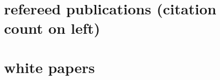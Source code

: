 \documentclass[]{luger-cv} %
\begin{document}
\header





\section{refereed publications {\small \normalfont (citation count on left)} }
%
\begin{list}{}{\pubslist}
    
\end{list}
%
\vspace{1em}

\section{white papers}
%                                                                                                                                                  
\begin{list}{}{\pubslist}
    
\end{list}
%                                                                                                                                                  
\vspace{1em}
\end{document}
